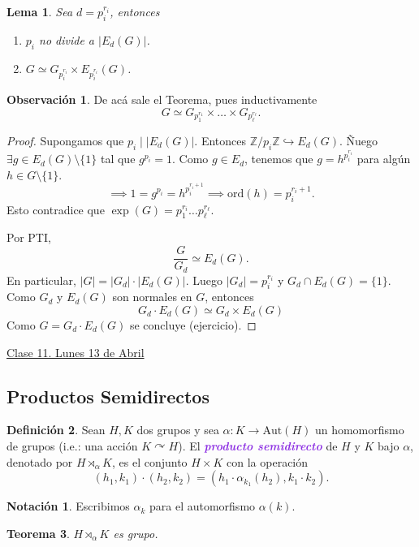 \documentclass{article}
\newtheorem{theorem}{Teorema}[subsection]
\newtheorem{lemma}[theorem]{Lema}
\theoremstyle{definition}
\newtheorem{definition}[theorem]{Definición}
\newtheorem*{notation}{Notación}
\newtheorem*{obs}{Observación}
\theoremstyle{remark}
\numberwithin{equation}{section}
\newcommand{\Z}{\mathbb{Z}}
\renewcommand{\a}{\alpha}
\newcommand{\embed}{\hookrightarrow}
\newcommand{\acts}{\curvearrowright}
\renewcommand{\c}{\cdot}
\newcommand{\Aut}{\mathrm{Aut}}
\newcommand{\ord}{\mathrm{ord}}
\newcommand{\abs}[1]{\left| #1 \right|}
\newcommand{\zmz}[1]{\Z/ #1 \Z}
\newcommand{\wea}[1]{\textcolor{BlueViolet}{\textbf{\emph{#1}}}}
\newcommand{\fecha}[1]{\begin{flushright} \underline{#1} \end{flushright}}
\begin{document}
\begin{lemma}
  Sea $d = p_i^{r_i}$, entonces
  \begin{enumerate}[(1)]
    \item $p_i$ no divide a $\abs{E_d(G)}$.
    \item $G \simeq G_{p_i^{r_i}} \times E_{p_i^{r_i}}(G)$.
  \end{enumerate}
\end{lemma}

\newpage
\begin{obs}
  De acá sale el Teorema, pues inductivamente
  \[G \simeq G_{p_1^{r_1}} \times \dots \times G_{p_\ell^{r_\ell}}.\]
\end{obs}
\begin{proof}
  Supongamos que $p_i \mid \abs{E_d(G)}$. Entonces $\zmz{p_i} \embed E_d(G)$. Ñuego $\exists g \in E_d(G) \setminus \{1\}$ tal que $g^{p_i} =1$.
  Como $g \in E_d$, tenemos que $g = h^{p_i^{r_i}}$ para algún $h \in G \setminus \{1\}$.
  \[\implies 1 = g^{p_i} = h^{p_i^{r_i+1}}
  \implies \ord(h) = p_i^{r_i+1}.\]
  Esto contradice que $\exp(G) = p_1^{r_i} \dots p_\ell^{r_\ell}$.

  Por PTI, $$\frac{G}{G_d} \simeq E_d(G).$$
  En particular, $\abs G = \abs{G_d} \c \abs{E_d(G)}$. Luego $\abs{G_d} = p_i^{r_i}$ y $G_d \cap E_d(G) = \{1\}$.
  Como $G_d$ y $E_d(G)$ son normales en $G$, entonces
  \[G_d \c E_d(G) \simeq G_d \times E_d(G)\]
  Como $G = G_d \c E_d(G)$ se concluye (ejercicio).
\end{proof}

\fecha{Clase 11. Lunes 13 de Abril}

\newpage
\subsection{Productos Semidirectos}

\begin{definition}
  Sean $H,K$ dos grupos y sea $\a \colon K \to \Aut(H)$ un homomorfismo de grupos (i.e.: una acción $K \acts H$). El \wea{producto semidirecto} de $H$ y $K$ bajo $\a$, denotado por $H \rtimes_\a K$, es el conjunto $H \times K$ con la operación
  \[(h_1,k_1) \c (h_2,k_2) = (h_1 \c \a_{k_1}(h_2), k_1 \c k_2).\]
\end{definition}

\begin{notation}
  Escribimos $\a_k$ para el automorfismo $\a(k)$.
\end{notation}

\begin{theorem}
  $H \rtimes_\a K$ es grupo.
\end{theorem}
\end{document}
